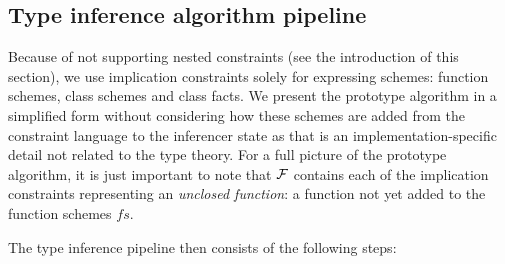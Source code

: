 \subsection{Type inference algorithm pipeline}

Because of not supporting nested constraints (see the introduction of this section), we use implication constraints solely for expressing schemes: function schemes, class schemes and class facts. We present the prototype algorithm in a simplified form without considering how these schemes are added from the constraint language to the inferencer state as that is an implementation-specific detail not related to the type theory. For a full picture of the prototype algorithm, it is just important to note that $\mathcal F$ contains each of the implication constraints representing an \emph{unclosed function}: a function not yet added to the function schemes $fs$.

The type inference pipeline then consists of the following steps:

